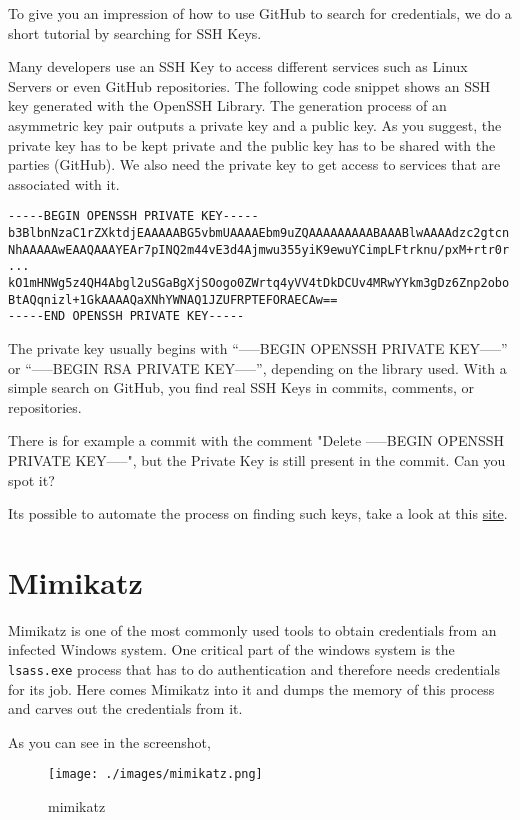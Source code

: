 To give you an impression of how to use GitHub to search for credentials, we do a short tutorial by searching for SSH Keys.

Many developers use an SSH Key to access different services such as Linux Servers or even GitHub repositories.
The following code snippet shows an SSH key generated with the OpenSSH Library.
The generation process of an asymmetric key pair outputs a private key and a public key.
As you suggest, the private key has to be kept private and the public key has to be shared with the parties (GitHub).
We also need the private key to get access to services that are associated with it.

\begin{lstlisting}
-----BEGIN OPENSSH PRIVATE KEY-----
b3BlbnNzaC1rZXktdjEAAAAABG5vbmUAAAAEbm9uZQAAAAAAAAABAAABlwAAAAdzc2gtcn
NhAAAAAwEAAQAAAYEAr7pINQ2m44vE3d4Ajmwu355yiK9ewuYCimpLFtrknu/pxM+rtr0r
...
kO1mHNWg5z4QH4Abgl2uSGaBgXjSOogo0ZWrtq4yVV4tDkDCUv4MRwYYkm3gDz6Znp2obo
BtAQqnizl+1GkAAAAQaXNhYWNAQ1JZUFRPTEFORAECAw==
-----END OPENSSH PRIVATE KEY-----
\end{lstlisting}

The private key usually begins with \enquote{-----BEGIN OPENSSH PRIVATE KEY-----} or \enquote{-----BEGIN RSA PRIVATE KEY-----}, depending on the library used.
With a simple search on GitHub, you find real SSH Keys in commits, comments, or repositories.

There is for example a commit with the comment "Delete -----BEGIN OPENSSH PRIVATE KEY-----", but the Private Key is still present in the commit.
Can you spot it?


Its possible to automate the process on finding such keys, take a look at this \href{https://book.hacktricks.xyz/generic-methodologies-and-resources/external-recon-methodology/github-leaked-secrets}{site}.

\section{Mimikatz}
Mimikatz is one of the most commonly used tools to obtain credentials from an infected Windows system.
One critical part of the windows system is the \lstinline{lsass.exe} process that has to do authentication and therefore needs credentials for its job.
Here comes Mimikatz into it and dumps the memory of this process and carves out the credentials from it.

As you can see in the screenshot, 

\begin{figure}[h]
    \centering
    \texttt{[image: ./images/mimikatz.png]}
    \caption{mimikatz}
    \label{fig:mimikatz}
\end{figure}

